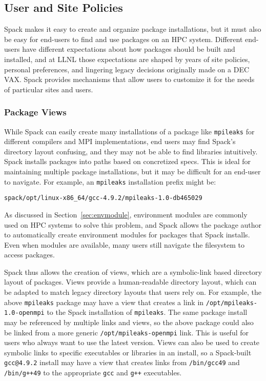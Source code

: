 
\subsection{User and Site Policies}
\label{sec:usecase-policy}

Spack makes it easy to create and organize package installations,
but it must also be easy for end-users to find and use packages on an HPC
system. Different end-users have different expectations about how packages
should be built and installed, and at LLNL those expectations are shaped
by years of site policies, personal preferences, and lingering legacy
decisions originally made on a DEC VAX.
Spack provides mechanisms that allow users to customize it for the needs
of particular sites and users.


\subsubsection{Package Views}
\label{sec:package-views}

While Spack can easily create many installations of a package like {\tt mpileaks}
for different compilers and MPI implementations, end users may find Spack's directory layout confusing, and they may not be able to find libraries intuitively.
Spack installs packages into paths based on concretized specs.
This is ideal for maintaining multiple package installations, 
but it may be difficult for an end-user to navigate.
For example, an {\tt mpileaks} installation prefix might be:
%
\begin{verbatim}
spack/opt/linux-x86_64/gcc-4.9.2/mpileaks-1.0-db465029
\end{verbatim}

As discussed in Section~\ref{sec:envmodule},
environment modules are commonly used on HPC systems to solve this problem,
and Spack allows the package author to automatically create environment modules
for packages that Spack installs.
Even when modules are available, many users still
navigate the filesystem to access packages.

Spack thus allows the creation of views, which are a symbolic-link based directory layout of packages.
Views provide a human-readable directory layout,
which can be adapted to match legacy directory layouts that users rely on.
For example, the above {\tt mpileaks} package may have a view that creates a link in
{\tt /opt/mpileaks-1.0-openmpi} to the Spack installation of {\tt mpileaks}.
The same package install may be referenced by multiple links and views,
so the above package could also be linked from a more generic {\tt /opt/mpileaks-openmpi}
link. This is useful for users who always want to use the latest version.
Views can also be used to create symbolic links to specific executables or libraries in an install,
so a Spack-built {\tt gcc@4.9.2} install may have a view that creates links from
{\tt /bin/gcc49} and {\tt /bin/g++49} to the appropriate {\tt gcc} and {\tt g++} executables.

